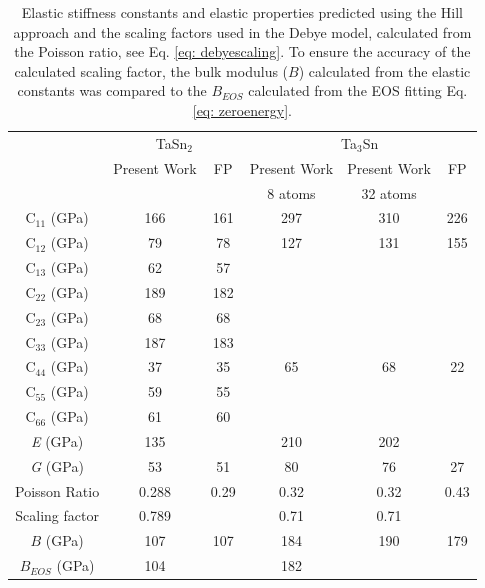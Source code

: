\newpage
\begin{table}[H]
	\caption{Elastic stiffness constants and elastic properties predicted using the Hill approach and the scaling factors used in the Debye model, calculated from the Poisson ratio, see Eq. \ref{eq: debyescaling}. To ensure the accuracy of the calculated scaling factor, the bulk modulus ($B$) calculated from the elastic constants was compared to the $B_{EOS}$ calculated from the EOS fitting Eq. \ref{eq: zeroenergy}.}
	\centering
	\begin{tabular}{ c c c c c c }
		\hline
		  & \multicolumn{2}{c}{TaSn$_2$} & \multicolumn{3}{c}{Ta$_3$Sn}\\
		  & Present Work & FP & Present Work & Present Work  & FP\\
		  & & \cite{Jouault1967_611,Bergerhoff1983,Karlsruhe,MaterialsProject} & 8 atoms & 32 atoms & \cite{Bergerhoff1983,Geller1955_165,Karlsruhe,MaterialsProject}\\
		  \hline
		  C$_{11}$ (GPa) & 166 & 161 & 297 & 310 & 226\\
		  C$_{12}$ (GPa) & 79 & 78 & 127 & 131 & 155\\
		  C$_{13}$ (GPa) & 62 & 57 & & & \\
		  C$_{22}$ (GPa) & 189 & 182 & & & \\
		  C$_{23}$ (GPa) & 68 & 68 & & & \\
		  C$_{33}$ (GPa) & 187 & 183 & & & \\
		  C$_{44}$ (GPa) & 37 & 35 & 65 & 68 & 22\\
		  C$_{55}$ (GPa) & 59 & 55 & & & \\
		  C$_{66}$ (GPa) & 61 & 60 & & & \\
		  \textit{E} (GPa) & 135 & & 210 & 202 &  \\
		  \textit{G} (GPa) & 53 & 51 & 80 & 76 & 27\\
		  Poisson Ratio & 0.288 & 0.29 & 0.32 & 0.32 & 0.43\\
		  Scaling factor & 0.789 & & 0.71 & 0.71 & \\
		  $B$ (GPa) & 107 & 107 & 184 & 190 & 179\\
		  $B_{EOS}$ (GPa) & 104 & & 182 & & \\
		\hline
	\end{tabular}
	\label{Ch4-table:TaSnelastic}
\end{table}
\clearpage

